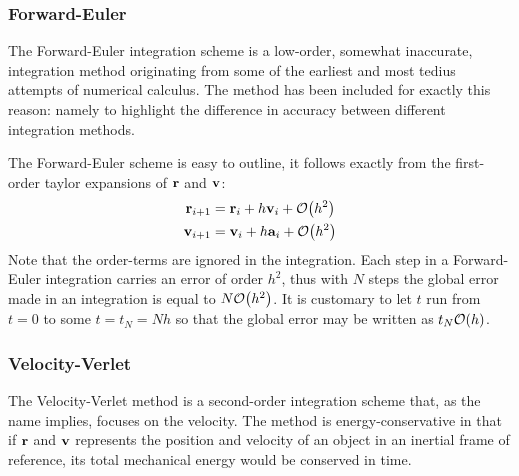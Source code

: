 \documentclass[reprint,english]{revtex4-1}
\begin{document}
\subsubsection{Forward-Euler}
The Forward-Euler integration scheme is a low-order, somewhat inaccurate, integration method originating from some of the earliest and most tedius attempts of numerical calculus. The method has been included for exactly this reason: namely to highlight the difference in accuracy between different integration methods.

The Forward-Euler scheme is easy to outline, it follows exactly from the first-order taylor expansions of \(\vb{r}\) and \(\vb{v}\):
\begin{subequations}\label{eq:forward_euler_method}
\begin{align}
\vb{r}_{i+1}&=\vb{r}_i+h\vb{v}_i+\order{h^2}\\
\vb{v}_{i+1}&=\vb{v}_i+h\vb{a}_i+\order{h^2}
\end{align}
\end{subequations}
Note that the order-terms are ignored in the integration. Each step in a Forward-Euler integration carries an error of order \(h^2\), thus with \(N\) steps the global error made in an integration is equal to \(N\order{h^2}\). It is customary to let \(t\) run from \(t=0\) to some \(t=t_N=Nh\) so that the global error may be written as \(t_N\order{h}\).
\subsubsection{Velocity-Verlet}
The Velocity-Verlet method is a second-order integration scheme that, as the name implies, focuses on the velocity. The method is energy-conservative in that if \(\vb{r}\) and \(\vb{v}\) represents the position and velocity of an object in an inertial frame of reference, its total mechanical energy would be conserved in time.
\end{document}

